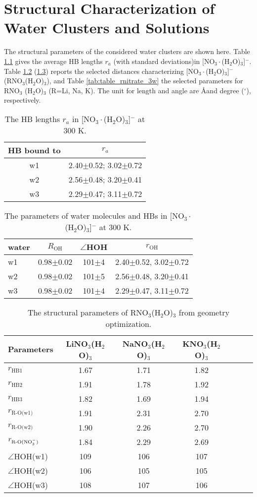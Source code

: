 \chapter{Structural Characterization of Water Clusters and Solutions}\label{structure_of_clusters}
The structural parameters of the considered water clusters are shown here.
Table \ref{tab:3_nitrate_bond} gives the average HB lengths $r_a$ (with standard deviations)in [NO$_3\cdot$(H$_2$O)$_3$]$^-$.  
Table \ref{tab:3w_nitrate} (\ref{tab:table_geo_opt}) reports the selected distances characterizing 
[NO$_3\cdot$(H$_2$O)$_3$]$^-$ (RNO$_3$(H$_2$O)$_3$), and Table \ref{tab:table_rnitrate_3w} the selected parameters for RNO$_3$   
 (H$_2$O)$_3$ (R=Li, Na, K).
The unit for length and angle are \AA and degree ($^\circ$), respectively.
% 
\begin{table}[!h]
\centering
\caption{\label{tab:3_nitrate_bond}%
The HB lengths $r_a$ in [NO$_3\cdot$(H$_2$O)$_3$]$^-$ at 300 K.} 
\begin{tabular}{cc} \\\toprule
 HB bound to & \multicolumn{1}{c}{ $r_a$} \\
\hline
 w1 &2.40$\pm$0.52; 3.02$\pm$0.72 \\
 w2 &2.56$\pm$0.48; 3.20$\pm$0.41 \\
 w3 &2.29$\pm$0.47; 3.11$\pm$0.72
\end{tabular}
\end{table}
%
\begin{table}[!htbp]
\centering
\caption{\label{tab:3w_nitrate}%
The parameters of water molecules and HBs in [NO$_3\cdot$(H$_2$O)$_3$]$^-$ at 300 K.}
\begin{tabular}{lccc}
water &$R_\text{OH}$ &$\angle$HOH & $r_\text{OH}$ \\
\hline
w1 &0.98$\pm$0.02 &101$\pm$4 & 2.40$\pm$0.52, 3.02$\pm$0.72 \\
w2 &0.98$\pm$0.02 &101$\pm$5 & 2.56$\pm$0.48, 3.20$\pm$0.41 \\
w3 &0.98$\pm$0.02 &101$\pm$4 & 2.29$\pm$0.47, 3.11$\pm$0.72
\end{tabular}
\end{table}
%
\begin{table}[!htbp]
\centering
\caption{\label{tab:table_geo_opt}%
  The structural parameters of RNO$_3$(H$_2$O)$_3$ from geometry optimization.} 
\begin{tabular}{l*{4}ccc}
Parameters  & LiNO$_3$(H$_2$O)$_3$& NaNO$_3$(H$_2$O)$_3$ & KNO$_3$(H$_2$O)$_3$\\
\hline
$r_\text{HB1}$& 1.67 & 1.71 & 1.82 \\
$r_\text{HB2}$& 1.91 & 1.78 & 1.92\\
$r_\text{HB3}$& 1.82 & 1.69 & 1.94\\
$r_\text{R-O(w1)}$ & 1.91 & 2.31 & 2.70\\
$r_\text{R-O(w2)}$ & 1.90 & 2.26 & 2.70\\
$r_\text{R-O(NO$_3^-$)}$ & 1.84 & 2.29 & 2.69 \\
$\angle$HOH(w1)& 109 & 106 &107 \\
$\angle$HOH(w2)& 106 & 105&105 \\
$\angle$HOH(w3)& 108 & 107 &106
\end{tabular}
\end{table}

